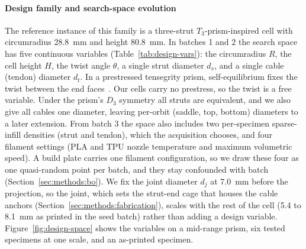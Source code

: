 \documentclass[lineno,nocopyright,upint,varvw,hyphenate]{asmejour}
\begin{document}
\paragraph{Design family and search-space evolution} The reference
instance of this family is a three-strut $T_3$-prism-inspired cell with
circumradius \SI{28.8}{mm} and height \SI{80.8}{mm}. In batches 1 and 2
the search space has five continuous variables
(Table~\ref{tab:design-vars}): the circumradius $R$, the cell height
$H$, the twist angle $\theta$, a single strut diameter $d_s$, and a
single cable (tendon) diameter $d_t$. In a prestressed tensegrity prism,
self-equilibrium fixes the twist between the end
faces~\citep{cao2024tensegrityprism}. Our cells carry no prestress, so
the twist is a free variable. Under the prism's $D_3$ symmetry
all struts are equivalent, and we also give all cables one diameter,
leaving per-orbit (saddle, top, bottom) diameters to a later
extension. From batch 3 the space also
includes two per-specimen sparse-infill densities (strut and tendon),
which the acquisition chooses, and four filament settings (PLA and TPU
nozzle temperature and maximum volumetric speed). A build plate carries
one filament configuration, so we draw these four as one quasi-random
point per batch, and they stay confounded with batch
(Section~\ref{sec:methods:bo}). We fix the joint diameter $d_j$ at
\SI{7.0}{mm} before the projection, so the joint, which sets the
strut-end cage that houses the cable anchors
(Section~\ref{sec:methods:fabrication}), scales with the rest of the cell
(5.4 to \SI{8.1}{mm} as printed in the seed batch) rather than adding a
design variable. Figure~\ref{fig:design-space} shows the variables
on a mid-range prism, six tested specimens at one scale, and an
as-printed specimen.
\end{document}
